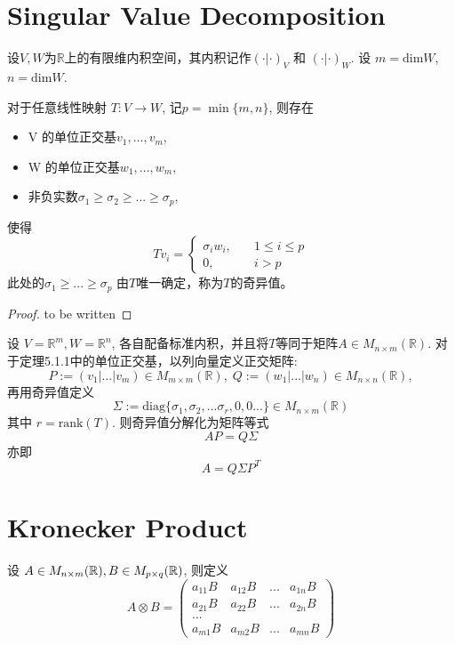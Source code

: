 \documentclass[11pt,fleqn]{book} %
\def\R{\mathbb{R}}
\begin{document}
\begin{CJK}{UTF8}{gkai}
\section{Singular Value Decomposition}
设$V, W$为$\R$上的有限维内积空间，其内积记作$(\cdot | \cdot)_V$ 和 $(\cdot | \cdot)_W$. 设 $m = \text{dim} W$, $n = \text{dim} W$.
\begin{theorem}
    [SVD] 对于任意线性映射 $T: V \to W$, 记$p = \min \{m, n\}$, 则存在 \\
    \begin{itemize}
        \item V 的单位正交基$v_1,...,v_m$, \\
        \item W 的单位正交基$w_1, ..., w_m$, \\
        \item 非负实数$\sigma_1 \geq \sigma_2 \geq ... \geq \sigma_p$, 
    \end{itemize}
    使得
    \[
        Tv_i = \begin{cases}
            \sigma_iw_i, \quad &1 \leq i \leq p \\
            0, \quad &i > p 
        \end{cases}\]
    此处的$\sigma_1 \geq ... \geq \sigma_p$ 由$T$唯一确定，称为$T$的奇异值。
\end{theorem}

\begin{proof}
    to be written
\end{proof}

\begin{theorem}
    [矩阵版本] 设 $V = \R^m, W = \R^n$, 各自配备标准内积，并且将$T$等同于矩阵$A \in M_{n \times m}(\R)$. 对于定理5.1.1中的单位正交基，以列向量定义正交矩阵:
    \[
        P := (v_1|...|v_m) \in M_{m \times m}(\R), \; Q := (w_1|...|w_n) \in M_{n \times n} (\R),\]
    再用奇异值定义
    \[
        \Sigma := \text{diag}\{\sigma_1, \sigma_2, ... \sigma_r, 0, 0...\} \in M_{n\times m}(\R)\]
        其中 $r = \text{rank}(T)$.
    则奇异值分解化为矩阵等式
    \[
        AP = Q\Sigma\]
    亦即 
    \[
        A = Q \Sigma P^T \]
\end{theorem}


\section{Kronecker Product}
\begin{definition}
    设 $A \in M_{n \x m }(\R), B \in M_{p \x q}(\R)$, 则定义
    \[
        A \otimes B = 
        \begin{pmatrix}
            a_{11}B & a_{12}B & ... & a_{1n}B \\
            a_{21}B & a_{22}B & ... & a_{2n}B \\
            ... \\
            a_{m1}B & a_{m2}B & ... & a_{mn}B 
        \end{pmatrix}\]
\end{definition}
\end{CJK}
\end{document}
